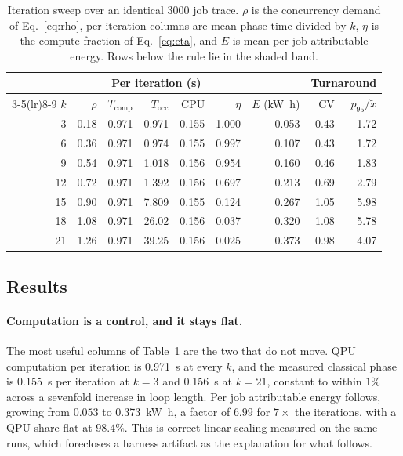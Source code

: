 \begin{table}[t]
\centering
\caption{Iteration sweep over an identical $3000$ job trace. $\rho$ is the concurrency demand of Eq.~\eqref{eq:rho}, per iteration columns are mean phase time divided by $k$, $\eta$ is the compute fraction of Eq.~\eqref{eq:eta}, and $E$ is mean per job attributable energy. Rows below the rule lie in the shaded band.}
\label{tab:iteration-sweep}
\small
\setlength{\tabcolsep}{3.5pt}
\begin{tabular}{@{}rrrrrrrrr@{}}
\toprule
 & & \multicolumn{3}{c}{Per iteration (\unit{\second})}
 & & & \multicolumn{2}{c}{Turnaround} \\
\cmidrule(lr){3-5}\cmidrule(lr){8-9}
$k$ & $\rho$ & $T_{\mathrm{comp}}$ & $T_{\mathrm{occ}}$ & CPU & $\eta$ & $E$ (\unit{\kilo\watt\hour})
 & CV & $p_{95}/\tilde{x}$ \\
\midrule
 3 & 0.18 & 0.971 &  0.971 & 0.155 & 1.000 & 0.053 & 0.43 & 1.72 \\
 6 & 0.36 & 0.971 &  0.974 & 0.155 & 0.997 & 0.107 & 0.43 & 1.72 \\
 9 & 0.54 & 0.971 &  1.018 & 0.156 & 0.954 & 0.160 & 0.46 & 1.83 \\
12 & 0.72 & 0.971 &  1.392 & 0.156 & 0.697 & 0.213 & 0.69 & 2.79 \\
\midrule
15 & 0.90 & 0.971 &  7.809 & 0.155 & 0.124 & 0.267 & 1.05 & 5.98 \\
18 & 1.08 & 0.971 & 26.02  & 0.156 & 0.037 & 0.320 & 1.08 & 5.78 \\
21 & 1.26 & 0.971 & 39.25  & 0.156 & 0.025 & 0.373 & 0.98 & 4.07 \\
\bottomrule
\end{tabular}
\end{table}

\subsection{Results}
\label{sec:iter-results}

\paragraph{Computation is a control, and it stays flat.}
The most useful columns of Table~\ref{tab:iteration-sweep} are the two that do not move. QPU computation per iteration is \qty{0.971}{\second} at every $k$, and the measured classical phase is \qty{0.155}{\second} per iteration at $k=3$ and \qty{0.156}{\second} at $k=21$, constant to within $1\%$ across a sevenfold increase in loop length. Per job attributable energy follows, growing from $0.053$ to \qty{0.373}{\kilo\watt\hour}, a factor of $6.99$ for $7\times$ the iterations, with a QPU share flat at $98.4\%$. This is correct linear scaling measured on the same runs, which forecloses a harness artifact as the explanation for what follows.

